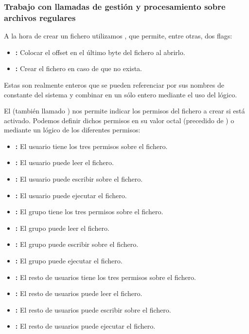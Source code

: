 \subsubsection{Trabajo con llamadas de gestión y procesamiento sobre archivos regulares}

A la hora de crear un fichero utilizamos , que permite, entre otras, dos flags:

\begin{itemize}
	\item{}\textbf{:} Colocar el offset en el último byte del fichero al abrirlo.
	\item{}\textbf{:} Crear el fichero en caso de que no exista.
\end{itemize}

Estas  son realmente enteros que se pueden referenciar por sus nombres de constante del sistema y combinar en un sólo entero mediante el uso del  lógico.

El  (también llamado ) nos permite indicar los permisos del fichero a crear si  está activado.
Podemos definir dichos permisos en su valor octal (precedido de ) o mediante un  lógico de los diferentes permisos:

\begin{itemize}
	\item{}\textbf{:} El usuario tiene los tres permisos sobre el fichero.
	\item{}\textbf{:} El usuario puede leer el fichero.
	\item{}\textbf{:} El usuario puede escribir sobre el fichero.
	\item{}\textbf{:} El usuario puede ejecutar el fichero.
	\item{}\textbf{:} El grupo tiene los tres permisos sobre el fichero.
	\item{}\textbf{:} El grupo puede leer el fichero.
	\item{}\textbf{:} El grupo puede escribir sobre el fichero.
	\item{}\textbf{:} El grupo puede ejecutar el fichero.
	\item{}\textbf{:} El resto de usuarios tiene los tres permisos sobre el fichero.
	\item{}\textbf{:} El resto de usuarios puede leer el fichero.
	\item{}\textbf{:} El resto de usuarios puede escribir sobre el fichero.
	\item{}\textbf{:} El resto de usuarios puede ejecutar el fichero.
\end{itemize}

